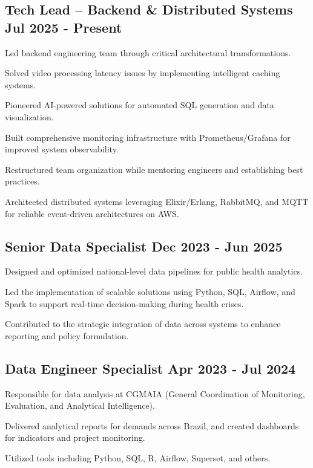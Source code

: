 \documentclass[letter,10pt]{article}
\begin{document}
\subsection{{Tech Lead – Backend \& Distributed Systems \hfill Jul 2025 - Present}}
\begin{zitemize}
\item Led backend engineering team through critical architectural transformations. 
\item Solved video processing latency issues by implementing intelligent caching systems.
\item Pioneered AI-powered solutions for automated SQL generation and data visualization.
\item Built comprehensive monitoring infrastructure with Prometheus/Grafana for improved system observability.
\item Restructured team organization while mentoring engineers and establishing best practices.
\item Architected distributed systems leveraging Elixir/Erlang, RabbitMQ, and MQTT for reliable event-driven architectures on AWS.
\end{zitemize}

\subsection{{Senior Data Specialist \hfill Dec 2023 - Jun 2025}}
\begin{zitemize}
\item Designed and optimized national-level data pipelines for public health analytics.
\item Led the implementation of scalable solutions using Python, SQL, Airflow, and Spark to support real-time decision-making during health crises.
\item Contributed to the strategic integration of data across systems to enhance reporting and policy formulation.
\end{zitemize}

\subsection{{Data Engineer Specialist \hfill Apr 2023 - Jul 2024}}
\begin{zitemize}
\item Responsible for data analysis at CGMAIA (General Coordination of Monitoring, Evaluation, and Analytical Intelligence).
\item Delivered analytical reports for demands across Brazil, and created dashboards for indicators and project monitoring.
\item Utilized tools including Python, SQL, R, Airflow, Superset, and others.
\end{zitemize}
\end{document}
